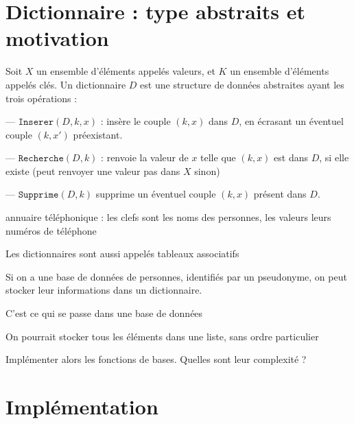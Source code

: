
\section{Dictionnaire : type abstraits et motivation}


\begin{definition}[Dictionnaire]
	Soit $X$ un ensemble d’éléments appelés valeurs, et $K$ un ensemble d’éléments appelés clés. Un dictionnaire $D$ est une structure de données abstraites ayant les trois opérations :
	
	— $\texttt{Inserer}(D,k,x)$ : insère le couple $(k, x)$ dans $D$, en écrasant un éventuel couple $(k, x')$ préexistant.
	
	— $\texttt{Recherche}(D,k)$ : renvoie la valeur de $x$ telle que $(k, x)$ est dans $D$, si elle existe (peut renvoyer une valeur pas dans $X$ sinon)
	
	— $\texttt{Supprime}(D,k)$ supprime un éventuel couple $(k, x)$ présent dans $D$.
\end{definition} 

\begin{example}
	annuaire téléphonique : les clefs sont les noms des personnes, les valeurs leurs numéros de téléphone
\end{example}

\begin{rem}
	Les dictionnaires sont aussi appelés tableaux associatifs
\end{rem}

\begin{appl}
	Si on a une base de données de personnes, identifiés par un pseudonyme, on peut stocker leur informations dans un dictionnaire.
\end{appl}

\begin{rem}
	C'est ce qui se passe dans une base de données
\end{rem}

\begin{impl}[naive]
	On pourrait stocker tous les éléments dans une liste, sans ordre particulier
\end{impl}

\begin{exercise}
	Implémenter alors les fonctions de bases. Quelles sont leur complexité ?
\end{exercise}

\section{Implémentation}

